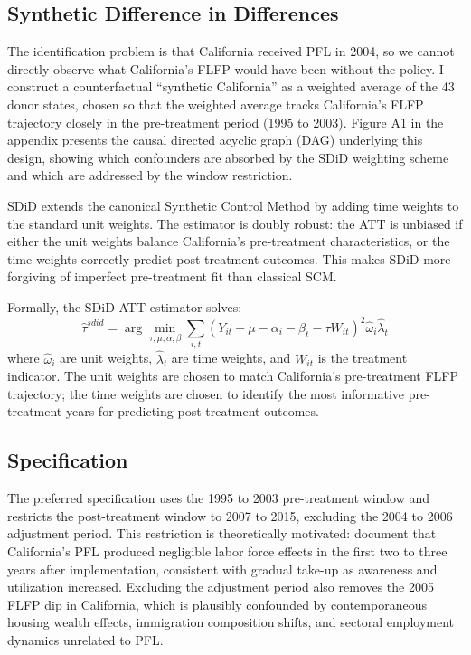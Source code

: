 \documentclass[12pt, letterpaper]{article}
\begin{document}
\subsection{Synthetic Difference in Differences}

The identification problem is that California received PFL in 2004, so we cannot directly observe what California's FLFP would have been without the policy. I construct a counterfactual ``synthetic California'' as a weighted average of the 43 donor states, chosen so that the weighted average tracks California's FLFP trajectory closely in the pre-treatment period (1995 to 2003). Figure A1 in the appendix presents the causal directed acyclic graph (DAG) underlying this design, showing which confounders are absorbed by the SDiD weighting scheme and which are addressed by the window restriction.

SDiD \citep{arkhangelsky2021} extends the canonical Synthetic Control Method \citep{abadie2010} by adding time weights to the standard unit weights. The estimator is doubly robust: the ATT is unbiased if either the unit weights balance California's pre-treatment characteristics, or the time weights correctly predict post-treatment outcomes. This makes SDiD more forgiving of imperfect pre-treatment fit than classical SCM.

Formally, the SDiD ATT estimator solves:
\begin{equation}
\hat{\tau}^{sdid} = \arg\min_{\tau, \mu, \alpha, \beta} \sum_{i,t} \left( Y_{it} - \mu - \alpha_i - \beta_t - \tau W_{it} \right)^2 \hat{\omega}_i \hat{\lambda}_t
\end{equation}
where $\hat{\omega}_i$ are unit weights, $\hat{\lambda}_t$ are time weights, and $W_{it}$ is the treatment indicator. The unit weights are chosen to match California's pre-treatment FLFP trajectory; the time weights are chosen to identify the most informative pre-treatment years for predicting post-treatment outcomes.

\subsection{Specification}

The preferred specification uses the 1995 to 2003 pre-treatment window and restricts the post-treatment window to 2007 to 2015, excluding the 2004 to 2006 adjustment period. This restriction is theoretically motivated: \citet{bailey2019} document that California's PFL produced negligible labor force effects in the first two to three years after implementation, consistent with gradual take-up as awareness and utilization increased. Excluding the adjustment period also removes the 2005 FLFP dip in California, which is plausibly confounded by contemporaneous housing wealth effects, immigration composition shifts, and sectoral employment dynamics unrelated to PFL.
\end{document}
